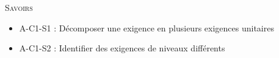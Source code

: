 \documentclass[11pt,oneside]{article}
\begin{document}
%
%
%
%

\vspace{.5cm}

\begin{center}
\end{center}






\begin{savoir}
\textsc{Savoirs}
\begin{itemize}
\item A-C1-S1 : Décomposer une exigence en plusieurs exigences unitaires
\item A-C1-S2 : Identifier des exigences de niveaux différents
\end{itemize}
\end{savoir}
 
\end{document}
